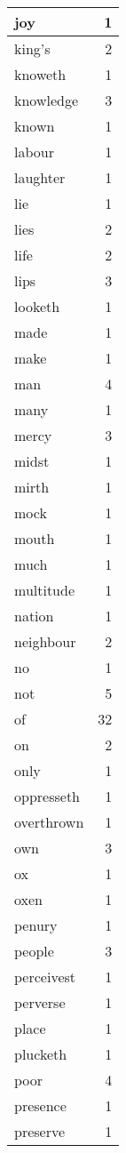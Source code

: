 \begin{center}
\begin{longtable}{l|r}
joy & 1\\ \hline 
king's & 2\\ \hline 
knoweth & 1\\ \hline 
knowledge & 3\\ \hline 
known & 1\\ \hline 
labour & 1\\ \hline 
laughter & 1\\ \hline 
lie & 1\\ \hline 
lies & 2\\ \hline 
life & 2\\ \hline 
lips & 3\\ \hline 
looketh & 1\\ \hline 
made & 1\\ \hline 
make & 1\\ \hline 
man & 4\\ \hline 
many & 1\\ \hline 
mercy & 3\\ \hline 
midst & 1\\ \hline 
mirth & 1\\ \hline 
mock & 1\\ \hline 
mouth & 1\\ \hline 
much & 1\\ \hline 
multitude & 1\\ \hline 
nation & 1\\ \hline 
neighbour & 2\\ \hline 
no & 1\\ \hline 
not & 5\\ \hline 
of & 32\\ \hline 
on & 2\\ \hline 
only & 1\\ \hline 
oppresseth & 1\\ \hline 
overthrown & 1\\ \hline 
own & 3\\ \hline 
ox & 1\\ \hline 
oxen & 1\\ \hline 
penury & 1\\ \hline 
people & 3\\ \hline 
perceivest & 1\\ \hline 
perverse & 1\\ \hline 
place & 1\\ \hline 
plucketh & 1\\ \hline 
poor & 4\\ \hline 
presence & 1\\ \hline 
preserve & 1\\ \hline 

\end{longtable}
\end{center}
